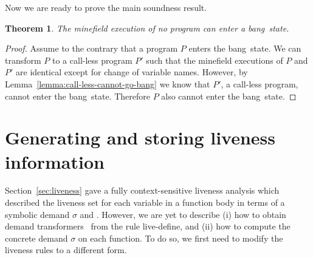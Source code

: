 \documentclass[9pt]{sigplanconf}
\newcommand{\bang}{\mbox{\sc bang}}
\newtheorem{theorem}{Theorem}[section]
\begin{document}
Now we are ready to prove the main soundness result.

\begin{theorem}
The  minefield  execution of  no  program  can enter  a
\bang\ state.
\end{theorem}
 
\begin{proof}
Assume to  the contrary that  a program $P$  enters the
\bang\  state.  We can  transform  $P$  to a  call-less
program $P'$ such that  the minefield executions of $P$
and $P'$  are identical  except for change  of variable
names.             However,                 by
Lemma~\ref{lemma:call-less-cannot-go-bang} we know that
$P'$,   a   call-less   program,   cannot   enter   the
\bang\  state.  Therefore   $P$  also  cannot  enter  the
\bang\ state.
\end{proof}
 




\section{Generating and storing liveness information}\label{sec:computing}
Section~\ref{sec:liveness}  gave   a  fully context-sensitive
liveness analysis which 
described the  liveness set for  each variable  in a function  body in
terms of  a symbolic demand  $\sigma$ and \Lfonly.  However,  we are yet
to describe  (i) how to obtain demand  transformers \Lfonly\ from
the  rule {\sc  live-define}, and  (ii)  how to  compute the  concrete
demand $\sigma$  on each function.   To do so,  we first need to  modify the
liveness rules to a different form.

\end{document}
